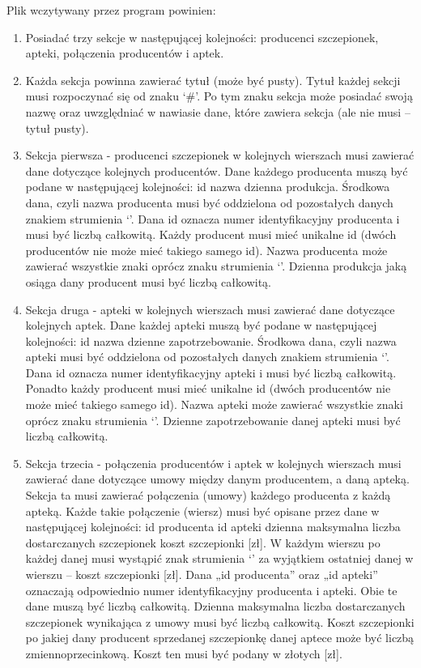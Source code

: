 \documentclass{article}
\begin{document}
Plik wczytywany przez program powinien:
\begin{enumerate}
    \item Posiadać trzy sekcje w następującej kolejności: producenci szczepionek, apteki, połączenia producentów i aptek.
    \item Każda sekcja powinna zawierać tytuł (może być pusty). Tytuł każdej sekcji musi rozpoczynać się od znaku ‘\#’. Po tym znaku sekcja może posiadać swoją nazwę oraz uwzględniać w nawiasie dane, które zawiera sekcja (ale nie musi – tytuł pusty).
    \item Sekcja pierwsza - producenci szczepionek w kolejnych wierszach musi zawierać dane dotyczące kolejnych producentów. Dane każdego producenta muszą być podane w następującej kolejności: id \textbar\space nazwa \textbar\space dzienna produkcja. Środkowa dana, czyli nazwa producenta musi być oddzielona od pozostałych danych znakiem strumienia ‘\textbar’. Dana id oznacza numer identyfikacyjny producenta i musi być liczbą całkowitą. Każdy producent musi mieć unikalne id (dwóch producentów nie może mieć takiego samego id). Nazwa producenta może zawierać wszystkie znaki oprócz znaku strumienia ‘\textbar’. Dzienna produkcja jaką osiąga dany producent musi być liczbą całkowitą.
    \item Sekcja druga - apteki w kolejnych wierszach musi zawierać dane dotyczące kolejnych aptek. Dane każdej apteki muszą być podane w następującej kolejności: id \textbar\space nazwa \textbar\space dzienne zapotrzebowanie. Środkowa dana, czyli nazwa apteki musi być oddzielona od pozostałych danych znakiem strumienia ‘\textbar’. Dana id oznacza numer identyfikacyjny apteki i musi być liczbą całkowitą. Ponadto każdy producent musi mieć unikalne id (dwóch producentów nie może mieć takiego samego id). Nazwa apteki może zawierać wszystkie znaki oprócz znaku strumienia ‘\textbar’. Dzienne zapotrzebowanie danej apteki musi być liczbą całkowitą.
    \item Sekcja trzecia - połączenia producentów i aptek w kolejnych wierszach musi zawierać dane dotyczące umowy między danym producentem, a daną apteką. Sekcja ta musi zawierać połączenia (umowy) każdego producenta z każdą apteką. Każde takie połączenie (wiersz) musi być opisane przez dane w następującej kolejności: id producenta \textbar\space id apteki \textbar\space dzienna maksymalna liczba dostarczanych szczepionek \textbar\space koszt szczepionki [zł]. W każdym wierszu po każdej danej musi wystąpić znak strumienia ‘\textbar’ za wyjątkiem ostatniej danej w wierszu – koszt szczepionki [zł].  Dana „id producenta” oraz „id apteki” oznaczają odpowiednio numer identyfikacyjny producenta i apteki. Obie te dane muszą być liczbą całkowitą. Dzienna maksymalna liczba dostarczanych szczepionek wynikająca z umowy musi być liczbą całkowitą. Koszt szczepionki po jakiej dany producent sprzedanej szczepionkę danej aptece może być liczbą zmiennoprzecinkową. Koszt ten musi być podany w złotych [zł].
\end{enumerate}
\end{document}
